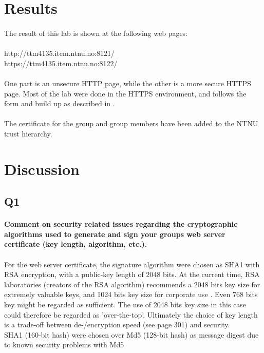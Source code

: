 \documentclass[a4paper,11pt]{article}
\begin{document}
\section{Results}
\paragraph{}The result of this lab is shown at the following web pages:\\
\\
http://ttm4135.item.ntnu.no:8121/\\
https://ttm4135.item.ntnu.no:8122/\\
\\
One part is an unsecure HTTP page, while the other is a more secure HTTPS page. Most of the lab were done in the HTTPS environment, and follows the form and build up as described in \cite{1}.
\paragraph{}The certificate for the group and group members have been added to the NTNU trust hierarchy.
\section{Discussion}
\subsection{Q1}
\paragraph{Comment on security related issues regarding the cryptographic algorithms used to
generate and sign your groups web server certiﬁcate (key length, algorithm, etc.).}
\paragraph{} For the web server certificate, the signature algorithm were chosen as SHA1 with RSA encryption, with a public-key length of 2048 bits. At the current time, RSA laboratories (creators of the RSA algorithm) recommends a 2048 bits key size for extremely valuable keys, and 1024 bits key size for corporate use \cite{2}. Even 768 bits key might be regarded as sufficient. The use of 2048 bits key size in this case could therefore be regarded as 'over-the-top'. Ultimately the choice of key length is a trade-off between de-/encryption speed (see \cite{5} page 301) and security.\\
SHA1 (160-bit hash) were chosen over Md5 (128-bit hash) as message digest due to known security problems with Md5 \cite{3}
\end{document}
